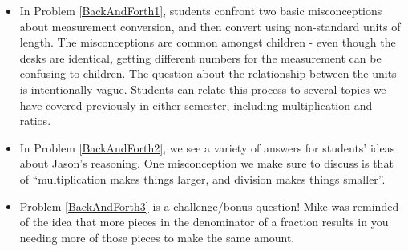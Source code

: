 \documentclass{ximera}
\begin{document}
\begin{instructorNotes}
\begin{itemize}
    \item In Problem \ref{BackAndForth1}, students confront two basic misconceptions about measurement conversion, and then convert using non-standard units of length.  The misconceptions are common amongst children - even though the desks are identical, getting different numbers for the measurement can be confusing to children.  The question about the relationship between the units is intentionally vague.  Students can relate this process to several topics we have covered previously in either semester, including multiplication and ratios.
    \item In Problem \ref{BackAndForth2}, we see a variety of answers for students' ideas about Jason's reasoning.  One misconception we make sure to discuss is that of ``multiplication makes things larger, and division makes things smaller''. 
    \item Problem \ref{BackAndForth3} is a challenge/bonus question!  Mike was reminded of the idea that more pieces in the denominator of a fraction results in you needing more of those pieces to make the same amount.
\end{itemize}




\end{instructorNotes}
\end{document}
